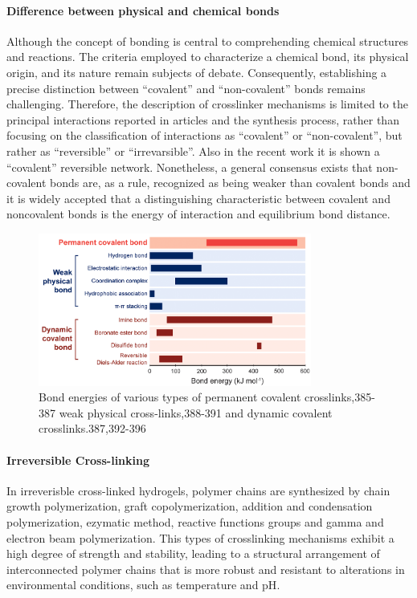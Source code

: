 \paragraph{Difference between physical and chemical bonds}
Although the concept of bonding is central to comprehending chemical structures and reactions.
The criteria employed to characterize a chemical bond, its physical origin, and its nature remain subjects of debate\citep{kumarDevelopingCriterionCharacterize2021}.
Consequently, establishing a precise distinction between ``covalent'' and ``non-covalent'' bonds remains challenging.
Therefore, the description of crosslinker mechanisms is limited to the principal interactions reported in articles and the synthesis process, rather than focusing on the classification of interactions as ``covalent'' or ``non-covalent'', but rather as ``reversible'' or ``irrevarsible''.
Also in the recent work \citep{picchioniHydrogelsBasedDynamic2018} it is shown a ``covalent'' reversible network. 
Nonetheless, a general consensus exists that non-covalent bonds are, as a rule, recognized as being weaker than covalent bonds and it is widely accepted that a distinguishing characteristic between covalent and noncovalent bonds is the energy of interaction and equilibrium bond distance\citep{kumarDevelopingCriterionCharacterize2021,novikovNonCovalentInteractionsPolymers2023}.

\begin{figure}[!h]
    \centering
    \includegraphics[width=0.8\textwidth]{pics/bonds_energy.png}
    \caption{Bond energies of various types of permanent covalent crosslinks,385-387 weak physical cross-links,388-391 and dynamic covalent crosslinks.387,392-396}
\end{figure}

\paragraph{Irreversible Cross-linking}
In irreverisble cross-linked hydrogels, polymer chains are synthesized by chain growth polymerization, graft copolymerization, addition and condensation polymerization, ezymatic method, reactive functions groups and gamma and electron beam polymerization\citep{maitraCrosslinkingHydrogelsReview2014,bustamante-torresHydrogelsClassificationAccording2021}.
This types of crosslinking mechanisms exhibit a high degree of strength and stability, leading to a structural arrangement of interconnected polymer chains that is more robust and resistant to alterations in environmental conditions, such as temperature and pH\citep{maitraCrosslinkingHydrogelsReview2014}.


